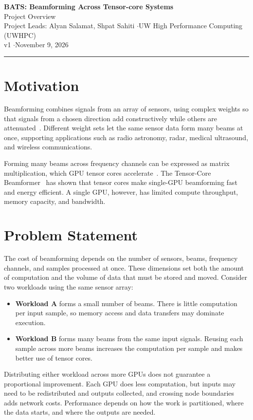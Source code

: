 \documentclass[10pt,letterpaper]{article}
\begin{document}
\begin{center}
  {\Large\bfseries BATS: Beamforming Across Tensor-core Systems}\\[3pt]
  {\large Project Overview}\\[5pt]
  Project Leads: Alyan Salamat, Shpat Sahiti \quad$\cdot$\quad UW High Performance Computing (UWHPC)\\[1pt]
  v1 \quad$\cdot$\quad November 9, 2026
\end{center}
\vspace{-4pt}\hrule\vspace{2pt}

\section{Motivation}

Beamforming combines signals from an array of sensors, using complex weights so that signals from a chosen direction add constructively while others are attenuated~\cite{vanVeen1988beamforming}. Different weight sets let the same sensor data form many beams at once, supporting applications such as radio astronomy, radar, medical ultrasound, and wireless communications.

Forming many beams across frequency channels can be expressed as matrix multiplication, which GPU tensor cores accelerate~\cite{cudaProgrammingGuide}. The Tensor-Core Beamformer~\cite{oostrum2025tcbf} has shown that tensor cores make single-GPU beamforming fast and energy efficient. A single GPU, however, has limited compute throughput, memory capacity, and bandwidth.

\section{Problem Statement}

The cost of beamforming depends on the number of sensors, beams, frequency channels, and samples processed at once. These dimensions set both the amount of computation and the volume of data that must be stored and moved. Consider two workloads using the same sensor array:
\begin{itemize}
  \item \textbf{Workload A} forms a small number of beams. There is little computation per input sample, so memory access and data transfers may dominate execution.
  \item \textbf{Workload B} forms many beams from the same input signals. Reusing each sample across more beams increases the computation per sample and makes better use of tensor cores.
\end{itemize}
Distributing either workload across more GPUs does not guarantee a proportional improvement. Each GPU does less computation, but inputs may need to be redistributed and outputs collected, and crossing node boundaries adds network costs. Performance depends on how the work is partitioned, where the data starts, and where the outputs are needed.
\end{document}
